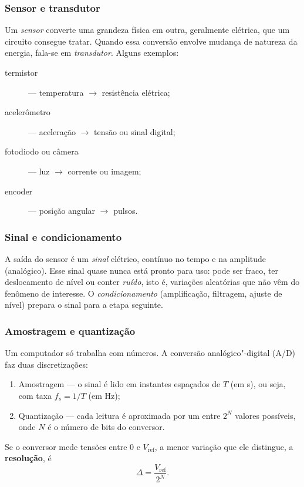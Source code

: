 \subsubsection{Sensor e transdutor}
 
Um \emph{sensor} converte uma grandeza física em outra, geralmente elétrica, que um circuito consegue tratar. Quando essa conversão envolve mudança de natureza da energia, fala-se em \emph{transdutor}. Alguns exemplos:
\begin{description}
	\item[termistor] --- temperatura $\rightarrow$ resistência elétrica;
	\item[acelerômetro] --- aceleração $\rightarrow$ tensão ou sinal digital;
	\item[fotodiodo ou câmera] --- luz $\rightarrow$ corrente ou imagem;
	\item[encoder] --- posição angular $\rightarrow$ pulsos.
\end{description}
 
\subsubsection{Sinal e condicionamento}
 
A saída do sensor é um \emph{sinal} elétrico, contínuo no tempo e na amplitude (analógico). Esse sinal quase nunca está pronto para uso: pode ser fraco, ter deslocamento de nível ou conter \emph{ruído}, isto é, variações aleatórias que não vêm do fenômeno de interesse. O \emph{condicionamento} (amplificação, filtragem, ajuste de nível) prepara o sinal para a etapa seguinte.
 
\subsubsection{Amostragem e quantização}
 
Um computador só trabalha com números. A conversão analógico"-digital (A/D) faz duas discretizações:
\begin{enumerate}
	\item Amostragem --- o sinal é lido em instantes espaçados de $T$ (em \unit{\second}), ou seja, com taxa $f_s = 1/T$ (em \unit{\hertz});
  \item Quantização --- cada leitura é aproximada por um entre $2^N$ valores possíveis, onde $N$ é o número de bits do conversor.
\end{enumerate}
 
Se o conversor mede tensões entre $0$ e $V_{\mathrm{ref}}$, a menor variação que ele distingue, a \textbf{resolução}, é
\begin{equation}
  \Delta = \frac{V_{\mathrm{ref}}}{2^{N}}.
  \label{eq:resolucao}
\end{equation}
 
